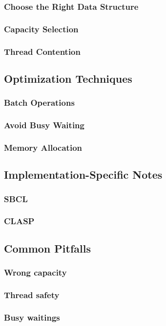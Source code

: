 \documentclass[12pt, letterpaper]{article}
\begin{document}
	\subsubsection{Choose the Right Data Structure}
	\subsubsection{Capacity Selection}
	\subsubsection{Thread Contention}
	\subsection{Optimization Techniques}
	\subsubsection{Batch Operations}
	\subsubsection{Avoid Busy Waiting}
	\subsubsection{Memory Allocation}
	\subsection{Implementation-Specific Notes}
	\subsubsection{SBCL}
	\subsubsection{CLASP}
	\subsection{Common Pitfalls}
	\subsubsection{Wrong capacity}
	\subsubsection{Thread safety}
	\subsubsection{Busy waitings}
\end{document}
